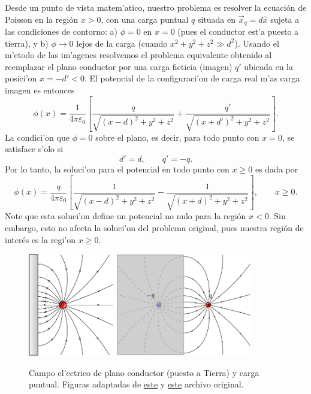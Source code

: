 Desde un punto de vista matem'atico, nuestro problema es resolver la ecuación de Poisson en la región $x>0$, con una carga puntual $q$ situada en $\vec{x}_q=d\hat{x}$ sujeta a las condiciones de contorno: a) $\phi = 0 $ en $x=0$ (pues el conductor est'a puesto a tierra), y b) $\phi\rightarrow 0$ lejos de la carga (cuando $x^2 + y^2 + z^2 \gg d^2$). Usando el m'etodo de las im'agenes resolvemos el problema equivalente obtenido al reemplazar el plano conductor por una carga ficticia (imagen) $q'$ ubicada en la posici'on $x=-d'<0$. El potencial de la configuraci'on de carga real m'as carga imagen es entonces
\begin{equation}
 \phi(x)=\frac{1}{4\pi\varepsilon_0}\left[\frac{q}{\sqrt{(x-d)^2+y^2+z^2}}+\frac
{q'}{\sqrt{(x+d')^2+y^2+z^2}}\right].
\end{equation}
La condici'on que $\phi=0$ sobre el plano, es decir, para todo punto con $x=0$,
se satisface s'olo si
\begin{equation}
 d'=d, \qquad q'=-q.
\end{equation}
Por lo tanto, la soluci'on para el potencial en todo punto con $x\ge 0$ es dada por
\begin{equation}\label{phicpplano}
 \phi(x)=\frac{q}{4\pi\varepsilon_0}\left[\frac{1}{\sqrt{(x-d)^2+y^2+z^2}}-\frac
{1}{\sqrt{(x+d)^2+y^2+z^2}}\right], \qquad x\ge 0.
\end{equation}
Note que esta soluci'on define un potencial no nulo para la región $x < 0$. Sin embargo, esto no afecta la soluci'on del problema original, pues nuestra región de interés es la regi'on $x \ge 0$.
\begin{center}
\begin{figure}[H]
\centerline{\includegraphics[height=4.5cm]{fig/fig-metodo-imagen-plano-01.pdf}
\hspace{2cm}
\includegraphics[height=4.5cm]{fig/fig-metodo-imagen-plano-02.pdf}}
\caption{Campo el'ectrico de plano conductor (puesto a Tierra) y carga puntual. 
Figuras adaptadas de  \href{http://commons.wikimedia.org/wiki/File:VFPt_image_charge_plane_horizontal.svg}{este} y \href{http://commons.wikimedia.org/wiki/File:VFPt_image_charge_plane.svg}{este} archivo original.}
\label{fig:pyc}
\end{figure}
\end{center}
